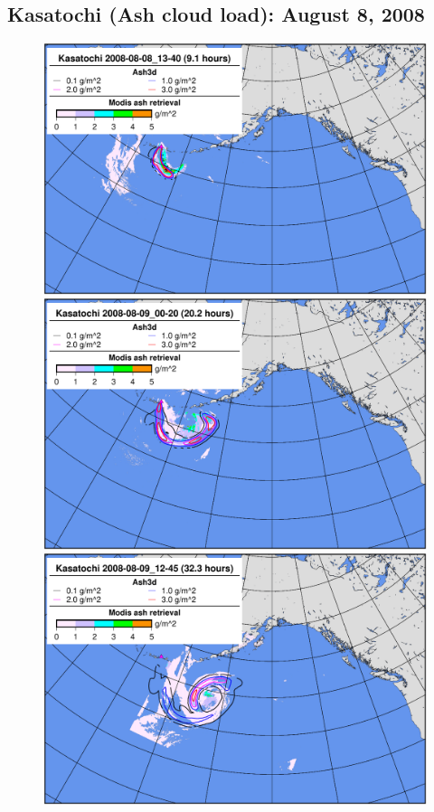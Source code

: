 \clearpage
\subsection{Kasatochi (Ash cloud load): August 8, 2008}
\begin{figure}[htbp]
\includegraphics[angle=0,scale=0.3]{Figures/TestCase_Results/ValidTest/Kasatochi_CloudLoad_0.pdf}
\includegraphics[angle=0,scale=0.3]{Figures/TestCase_Results/ValidTest/Kasatochi_CloudLoad_1.pdf}
\includegraphics[angle=0,scale=0.3]{Figures/TestCase_Results/ValidTest/Kasatochi_CloudLoad_2.pdf}

\end{figure}
